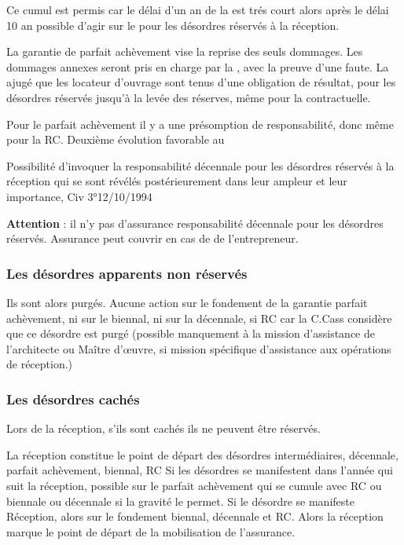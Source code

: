 		Ce cumul est permis car le délai d’un an de la \gpa est trés court alors après le délai 10 an possible d’agir sur le \RC pour les désordres réservés à la réception.

		La garantie de parfait achèvement vise la reprise des seuls dommages. Les dommages annexes seront pris en charge par la \RC, avec la preuve d’une faute.
		La \civTrois ajugé que les locateur d’ouvrage sont tenus d’une obligation de résultat, pour les désordres réservés jusqu’à la levée des réserves, même pour la contractuelle.

		Pour le parfait achèvement il y a une présomption de responsabilité, donc même pour la RC.
		Deuxième évolution favorable au \MO

		Possibilité d’invoquer la responsabilité décennale pour les désordres réservés à la réception qui se sont révélés postérieurement dans leur ampleur et leur importance, Civ 3°12/10/1994

		\textbf{Attention} : il n'y pas d’assurance responsabilité décennale pour les désordres réservés.
		Assurance \DO peut couvrir en cas de \MED de l’entrepreneur.


		\subsubsection{Les désordres apparents non réservés}

			Ils sont alors purgés. Aucune action sur le fondement de la garantie parfait achèvement, ni sur le biennal, ni sur la décennale, si RC car la C.Cass considère que ce désordre est purgé (possible manquement à la mission d’assistance de l’architecte ou Maître d’œuvre, si mission spécifique d’assistance aux opérations de réception.)

		\subsubsection{Les désordres cachés}

		Lors de la réception, s’ils sont cachés ils ne peuvent être réservés.

		La réception constitue le point de départ des désordres intermédiaires, décennale, parfait achèvement, biennal, RC
		Si les désordres se manifestent dans l’année qui suit la réception, possible sur le parfait achèvement qui se cumule avec RC ou biennale ou décennale si la gravité le permet.
		Si le désordre se manifeste Réception, alors sur le fondement biennal, décennale et RC. Alors la réception marque le point de départ de la mobilisation de l’assurance.


